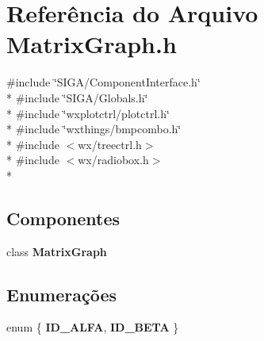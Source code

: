\section{Referência do Arquivo Matrix\+Graph.\+h}
\label{_matrix_graph_8h}
{\ttfamily \#include \char`\"{}S\+I\+G\+A/\+Component\+Interface.\+h\char`\"{}}\\*
{\ttfamily \#include \char`\"{}S\+I\+G\+A/\+Globals.\+h\char`\"{}}\\*
{\ttfamily \#include \char`\"{}wxplotctrl/plotctrl.\+h\char`\"{}}\\*
{\ttfamily \#include \char`\"{}wxthings/bmpcombo.\+h\char`\"{}}\\*
{\ttfamily \#include $<$wx/treectrl.\+h$>$}\\*
{\ttfamily \#include $<$wx/radiobox.\+h$>$}\\*
\subsection*{Componentes}
\begin{DoxyCompactItemize}
\item 
class {\bf Matrix\+Graph}
\end{DoxyCompactItemize}
\subsection*{Enumerações}
\begin{DoxyCompactItemize}
\item 
enum \{ {\bf I\+D\+\_\+\+A\+L\+FA}, 
{\bf I\+D\+\_\+\+B\+E\+TA}
 \}
\end{DoxyCompactItemize}
